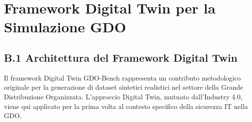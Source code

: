 \appendix
\chapter{Framework Digital Twin per la Simulazione GDO}
\label{app:digital-twin}

\section{B.1 Architettura del Framework Digital Twin}


Il framework Digital Twin GDO-Bench rappresenta un contributo metodologico originale per la generazione di dataset sintetici realistici nel settore della Grande Distribuzione Organizzata. L'approccio Digital Twin, mutuato dall'Industry 4.0\autocite{tao2019digital}, viene qui applicato per la prima volta al contesto specifico della sicurezza IT nella GDO.
